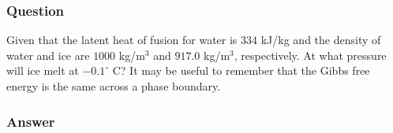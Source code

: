 \subsubsection{Question}
Given that the latent heat of fusion for water is $334$ kJ/kg and the density of water and ice are $1000$ kg/m$^3$ and $917.0$ kg/m$^3$, respectively. At what pressure will ice melt at $-0.1^{\circ}$ C? It may be useful to remember that the Gibbs free energy is the same across a phase boundary.
\subsubsection{Answer}



